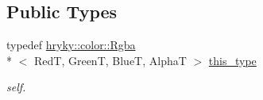 \subsection*{Public Types}
\begin{DoxyCompactItemize}
\item 
\hypertarget{classhryky_1_1color_1_1_rgba_a6ffc48e44b20a791c6bd35bf637a54ad}{typedef \hyperlink{classhryky_1_1color_1_1_rgba}{hryky\-::color\-::\-Rgba}\\*
$<$ Red\-T, Green\-T, Blue\-T, Alpha\-T $>$ \hyperlink{classhryky_1_1color_1_1_rgba_a6ffc48e44b20a791c6bd35bf637a54ad}{this\-\_\-type}}\label{classhryky_1_1color_1_1_rgba_a6ffc48e44b20a791c6bd35bf637a54ad}

\begin{DoxyCompactList}\small\item\em self. \end{DoxyCompactList}\end{DoxyCompactItemize}
